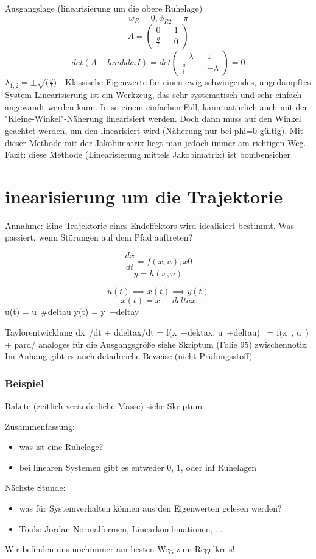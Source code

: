 \documentclass[a4paper]{article}
\begin{document}
Ausgangslage (linearisierung um die obere Ruhelage)
\[w_{R}=0, \phi_{R2}=\pi\]
\[A=\begin{pmatrix}
0 && 1\\
\frac{g}{l} && 0
\end{pmatrix} \]
\[det(A-lambda.I)=det\begin{pmatrix}
-\lambda && 1\\
\frac{g}{l} && -\lambda
\end{pmatrix}
=0\]
$\lambda_{1,2}=\pm\sqrt(\frac{g}{l})$  - Klassische Eigenwerte für einen ewig schwingendes, ungedämpftes System
Linearisierung ist ein Werkzeug, das sehr systematisch und sehr einfach angewandt werden kann.
In so einem einfachen Fall, kann natürlich auch mit der "Kleine-Winkel"-Näherung linearisiert werden.
Doch dann muss auf den Winkel geachtet werden, um den linearisiert wird (Näherung nur bei phi=0 gültig).
Mit dieser Methode mit der Jakobimatrix liegt man jedoch immer am richtigen Weg.
    -Fazit: diese Methode (Linearisierung mittels Jakobimatrix) ist bombensicher

\section*{inearisierung um die Trajektorie}
Annahme: Eine Trajektorie eines Endeffektors wird idealisiert bestimmt. Was passiert, wenn Störungen
auf dem Pfad auftreten?

\[\frac{dx}{dt}=f(x,u), x0\]
\[y=h(x,u)\]

\[\tilde{u}(t)\implies  \tilde{x}(t) \implies \tilde{y}(t)\]
\[x(t) = x~+deltax\]
u(t) = u~#deltau
y(t) = y~+deltay

Taylorentwicklung
dx~/dt + ddeltax/dt = f(x~+dektax, u~+deltau)
                    ~= f(x~, u~) + pard/
analoges für die Ausgangsgröße
siehe Skriptum (Folie 95)
zwischennotiz: Im Anhang gibt es auch detailreiche Beweise (nicht Prüfungsstoff)

\subsubsection*{Beispiel} Rakete (zeitlich veränderliche Masse)
siehe Skriptum

Zusammenfassung:
\begin{itemize}
    \item was ist eine Ruhelage?
    \item bei linearen Systemen gibt es entweder 0, 1, oder inf Ruhelagen
\end{itemize}
Nächste Stunde:
\begin{itemize}
    \item was für Systemverhalten können aus den Eigenwerten gelesen werden?
    \item Tools: Jordan-Normalformen, Linearkombinationen, ...
\end{itemize}
Wir befinden uns nochimmer am besten Weg zum Regelkreis!
\end{document}

